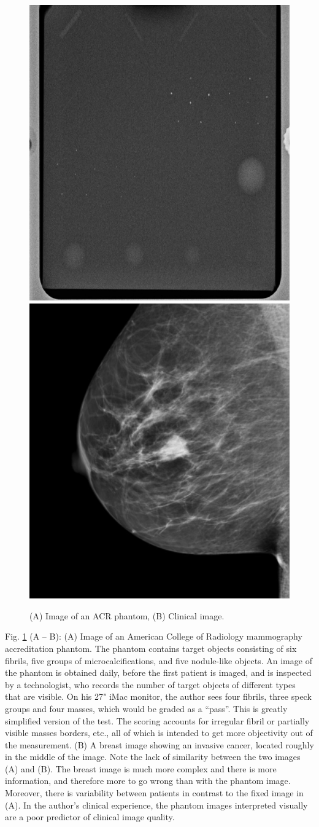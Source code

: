 \documentclass[
]{book}
\begin{document}
\begin{figure}
\includegraphics[width=0.5\linewidth]{images/AcrPhantom} \includegraphics[width=0.5\linewidth]{images/Clinical} \caption{(A) Image of an ACR phantom, (B) Clinical image.}\label{fig:acrPhantomClinical}
\end{figure}

Fig. \ref{fig:acrPhantomClinical} (A -- B): (A) Image of an American College of Radiology mammography accreditation phantom. The phantom contains target objects consisting of six fibrils, five groups of microcalcifications, and five nodule-like objects. An image of the phantom is obtained daily, before the first patient is imaged, and is inspected by a technologist, who records the number of target objects of different types that are visible. On his 27" iMac monitor, the author sees four fibrils, three speck groups and four masses, which would be graded as a ``pass''. This is greatly simplified version of the test. The scoring accounts for irregular fibril or partially visible masses borders, etc., all of which is intended to get more objectivity out of the measurement. (B) A breast image showing an invasive cancer, located roughly in the middle of the image. Note the lack of similarity between the two images (A) and (B). The breast image is much more complex and there is more information, and therefore more to go wrong than with the phantom image. Moreover, there is variability between patients in contrast to the fixed image in (A). In the author's clinical experience, the phantom images interpreted visually are a poor predictor of clinical image quality.
\end{document}
